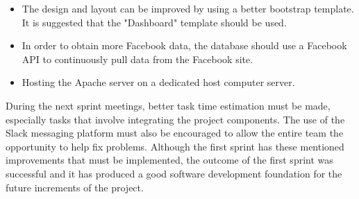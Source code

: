 \documentclass[12pt,onecolumn]{article}
\begin{document}
	\begin{itemize}
		\item The design and  layout can be improved by using a better bootstrap template. It is suggested that the "Dashboard" template should be used.
		\item In order to obtain more Facebook data, the database should use a Facebook API to continuously pull data from the Facebook site. 
		\item Hosting the Apache server on a dedicated host computer server.
	\end{itemize}
	
	During the next sprint meetings, better task time estimation must be made, especially tasks that involve integrating the project components. The use of the Slack messaging platform must also be encouraged to allow the entire team the opportunity to help fix problems. Although the first sprint has these mentioned improvements that must be implemented, the outcome of the first sprint was successful and it has produced a good software development foundation for the future increments of the project.
	
\end{document}
